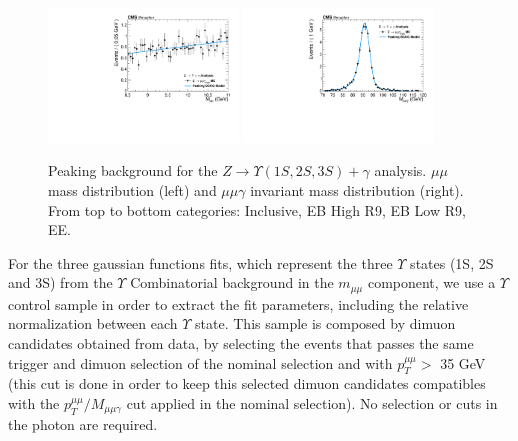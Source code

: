 \begin{figure}[!htbp]
\begin{center}
\includegraphics[width=0.45\textwidth]{figures_and_tables/fitPlotFiles2D/ZToUpsilonPhotonSignalAndBackgroundFit/mMuMNU_ZToUpsilon1SPhotonSignalAndBackgroundFit_PeakingBackground_Cat3}\hspace*{1.cm}
\includegraphics[width=0.45\textwidth]{figures_and_tables/fitPlotFiles2D/ZToUpsilonPhotonSignalAndBackgroundFit/mHZ_ZToUpsilon1SPhotonSignalAndBackgroundFit_PeakingBackground_Cat3}\hspace*{1.cm}


\end{center}\vspace*{-.5cm}
\caption{Peaking background for the $Z \rightarrow \Upsilon(1S,2S,3S) +\gamma$ analysis. $\mu\mu$ mass distribution (left) and $\mu\mu\gamma$ invariant mass distribution (right). From top to bottom categories: Inclusive, EB High R9, EB Low R9, EE.}
\label{fig:ZToUpsilon_PeakingBackground}
\end{figure}

For the three gaussian functions fits, which represent the three $\Upsilon$ states (1S, 2S and 3S) from the $\Upsilon$ Combinatorial background in the $m_{\mu\mu}$ component, we use a $\Upsilon$ control sample in order to extract the fit parameters, including the relative normalization between each $\Upsilon$ state. This sample is composed by dimuon candidates obtained from data, by selecting the events that passes the same trigger and dimuon selection of the nominal selection and with $p_{T}^{\mu\mu} > $ 35 GeV (this cut is done in order to keep this selected dimuon candidates compatibles with the $p_{T}^{\mu\mu}/M_{\mu\mu\gamma}$ cut applied in the nominal selection). No selection or cuts in the photon are required.


